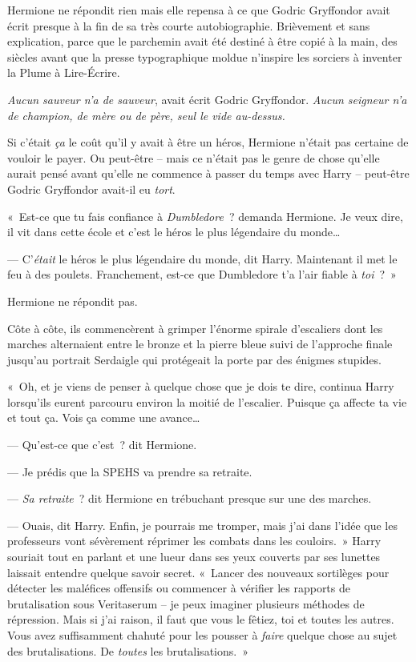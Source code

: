 Hermione ne répondit rien mais elle repensa à ce que Godric Gryffondor avait écrit presque à la fin de sa très courte autobiographie.
Brièvement et sans explication, parce que le parchemin avait été destiné à être copié à la main, des siècles avant que la presse typographique moldue n'inspire les sorciers à inventer la Plume à Lire-Écrire.

\emph{Aucun sauveur n'a de sauveur}, avait écrit Godric Gryffondor.
\emph{Aucun seigneur n'a de champion, de mère ou de père, seul le vide au-dessus.}

Si c'était \emph{ça} le coût qu'il y avait à être un héros, Hermione n'était pas certaine de vouloir le payer.
Ou peut-être -- mais ce n'était pas le genre de chose qu'elle aurait pensé avant qu'elle ne commence à passer du temps avec Harry -- peut-être Godric Gryffondor avait-il eu \emph{tort}.

«~Est-ce que tu fais confiance à \emph{Dumbledore}~? demanda Hermione.
Je veux dire, il vit dans cette école et c'est le héros le plus légendaire du monde…

--- C'\emph{était} le héros le plus légendaire du monde, dit Harry.
Maintenant il met le feu à des poulets.
Franchement, est-ce que Dumbledore t'a l'air fiable à \emph{toi}~?~»

Hermione ne répondit pas.

Côte à côte, ils commencèrent à grimper l'énorme spirale d'escaliers dont les marches alternaient entre le bronze et la pierre bleue suivi de l'approche finale jusqu'au portrait Serdaigle qui protégeait la porte par des énigmes stupides.

«~Oh, et je viens de penser à quelque chose que je dois te dire, continua Harry lorsqu'ils eurent parcouru environ la moitié de l'escalier.
Puisque ça affecte ta vie et tout ça.
Vois ça comme une avance…

--- Qu'est-ce que c'est~? dit Hermione.

--- Je prédis que la SPEHS va prendre sa retraite.

--- \emph{Sa retraite}~? dit Hermione en trébuchant presque sur une des marches.

--- Ouais, dit Harry.
Enfin, je pourrais me tromper, mais j'ai dans l'idée que les professeurs vont sévèrement réprimer les combats dans les couloirs.~»
Harry souriait tout en parlant et une lueur dans ses yeux couverts par ses lunettes laissait entendre quelque savoir secret.
«~Lancer des nouveaux sortilèges pour détecter les maléfices offensifs ou commencer à vérifier les rapports de brutalisation sous Veritaserum -- je peux imaginer plusieurs méthodes de répression.
Mais si j'ai raison, il faut que vous le fêtiez, toi et toutes les autres.
Vous avez suffisamment chahuté pour les pousser à \emph{faire} quelque chose au sujet des brutalisations.
De \emph{toutes} les brutalisations.~»

